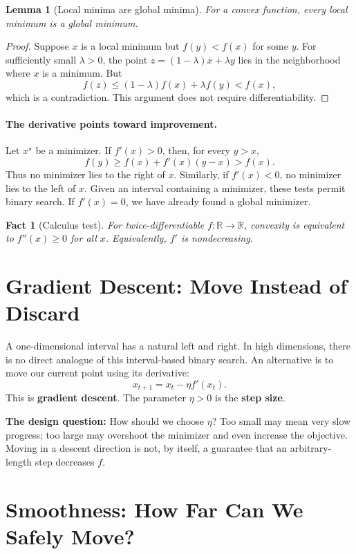 \documentclass[11pt,letterpaper]{article}
\newif\ifstudentversion
\newcommand{\hide}[1]{%
  \ifstudentversion
    \ifmmode\phantom{#1}\else\underline{\phantom{#1}}\fi
  \else #1\fi}
\theoremstyle{definition}
\theoremstyle{plain}
\newtheorem{lemma}{Lemma}
\newtheorem{fact}{Fact}
\newcounter{question}
\newcommand{\R}{\mathbb R}
\newcommand{\xstar}{x^\star}
\begin{document}
\begin{lemma}[Local minima are global minima]
For a convex function, every local minimum is a global minimum.
\end{lemma}
\begin{proof}
Suppose $x$ is a local minimum but $f(y)<f(x)$ for some $y$.
For sufficiently small $\lambda>0$, the point
$z=(1-\lambda)x+\lambda y$ lies in the neighborhood where $x$ is a minimum.
But
\[
  f(z)\leq(1-\lambda)f(x)+\lambda f(y)<f(x),
\]
which is a contradiction. This argument does not require differentiability.
\end{proof}

\paragraph{The derivative points toward improvement.}
Let $\xstar$ be a minimizer. If $f'(x)>0$, then, for every $y>x$,
\[
  f(y)\geq f(x)+f'(x)(y-x)>f(x).
\]
Thus no minimizer lies to the \hide{right} of $x$. Similarly, if
$f'(x)<0$, no minimizer lies to the \hide{left} of $x$.
Given an interval containing a minimizer, these tests permit binary search.
If $f'(x)=0$, we have already found a global minimizer.

\begin{fact}[Calculus test]
For twice-differentiable $f:\R\to\R$, convexity is equivalent to
$f''(x)\geq0$ for all $x$. Equivalently, $f'$ is nondecreasing.
\end{fact}

\section{Gradient Descent: Move Instead of Discard}

A one-dimensional interval has a natural left and right. In high dimensions,
there is no direct analogue of this interval-based binary search.
An alternative is to move our current point using its derivative:
\[
  \boxed{x_{t+1}=x_t-\eta f'(x_t).}
\]
This is \hide{\textbf{gradient descent}}. The parameter $\eta>0$ is the
\hide{\textbf{step size}}.

\textbf{The design question:} How should we choose $\eta$? Too small may
mean very slow progress; too large may overshoot the minimizer and even
increase the objective. Moving in a descent direction is not, by itself,
a guarantee that an arbitrary-length step decreases $f$.

\newpage
\section{Smoothness: How Far Can We Safely Move?}
\end{document}
